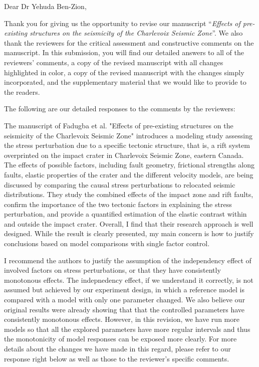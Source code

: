 \documentclass[12pt]{article}
\date{}
\newcommand\PaperTitle[1]{``\textit{#1}''}
\begin{document}
\noindent Dear Dr Yehuda Ben-Zion,
\\\vspace{1em}

Thank you for giving us the opportunity to revise our manuscript \PaperTitle{Effects of pre-existing structures on the seismicity of the Charlevoix Seismic Zone}. We also thank the reviewers for the critical assessment and constructive comments on the manuscript. In this submission, you will find our detailed answers to all of the reviewers’ comments, a copy of the revised manuscript with all changes highlighted in color, a copy of the revised manuscript with the changes simply incorporated, and the supplementary material that we would like to provide to the readers.

The following are our detailed responses to the comments by the reviewers:


\begin{response}{The manuscript of Fadugba et al. "Effects of pre-existing structures on the seismicity of the Charlevoix Seismic Zone" introduces a modeling study assessing the stress perturbation due to a specific tectonic structure, that is, a rift system overprinted on the impact crater in Charlevoix Seismic Zone, eastern Canada. The effects of possible factors, including fault geometry, frictional strengths along faults, elastic properties of the crater and the different velocity models, are being discussed by comparing the causal stress perturbations to relocated seismic distributions. They study the combined effects of the impact zone and rift faults, confirm the importance of the two tectonic factors in explaining the stress perturbation, and provide a quantified estimation of the elastic contrast within and outside the impact crater. Overall, I find that their research approach is well designed. While the result is clearly presented, my main concern is how to justify conclusions based on model comparisons with single factor control.}
\end{response}

\begin{response}{I recommend the authors to justify the assumption of the independency effect of involved factors on stress perturbations, or that they have consistently monotonous effects.}
    The indepnedency effect, if we understand it correctly, is not assumed but achieved by our experiment design, in which a reference model is compared with a model with only one parameter changed. We also believe our original results were already showing that that the controlled parameters have consistently monotonous effects. However, in this revision, we have run more models so that all the explored parameters have more regular intervals and thus the monotonicity of model responses can be exposed more clearly. For more details about the changes we have made in this regard, please refer to our response right below as well as those to the reviewer's specific comments.
\end{response}
\end{document}
